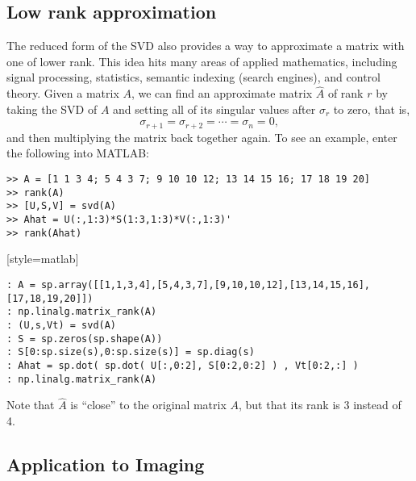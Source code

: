 \subsection{Low rank approximation}

The reduced form of the SVD also provides a way to approximate a
matrix with one of lower rank. This idea hits many areas of applied
mathematics, including signal processing, statistics, semantic
indexing (search engines), and control theory.  Given a matrix $A$,
we can find an approximate matrix $\widehat A$ of rank $r$ by taking
the SVD of $A$ and setting all of its singular values after
$\sigma_r$ to zero, that is,
\[
\sigma_{r+1} = \sigma_{r+2} = \cdots = \sigma_n = 0,
\]
and then multiplying the matrix back together again.  To see an
example, enter the following into MATLAB:

\begin{matlab}
 \begin{lstlisting}[style=matlab]
>> A = [1 1 3 4; 5 4 3 7; 9 10 10 12; 13 14 15 16; 17 18 19 20]
>> rank(A)
>> [U,S,V] = svd(A)
>> Ahat = U(:,1:3)*S(1:3,1:3)*V(:,1:3)'
>> rank(Ahat)
\end{lstlisting}[style=matlab]
\end{matlab}
\begin{python}
\begin{lstlisting}[style=python]
: A = sp.array([[1,1,3,4],[5,4,3,7],[9,10,10,12],[13,14,15,16],[17,18,19,20]])
: np.linalg.matrix_rank(A)
: (U,s,Vt) = svd(A)
: S = sp.zeros(sp.shape(A))
: S[0:sp.size(s),0:sp.size(s)] = sp.diag(s)
: Ahat = sp.dot( sp.dot( U[:,0:2], S[0:2,0:2] ) , Vt[0:2,:] )
: np.linalg.matrix_rank(A)
\end{lstlisting}
\end{python}
Note that $\widehat A$ is ``close'' to the original matrix $A$, but
that its rank is 3 instead of 4.

\subsection{Application to Imaging}

